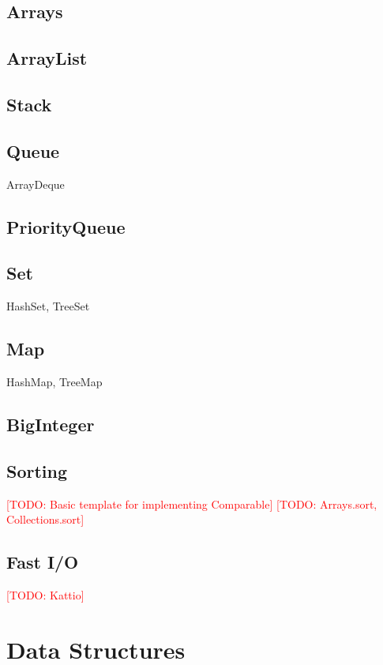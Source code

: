 \documentclass[10pt]{book}
\newcommand{\todo}[1]{\textcolor{red}{[TODO: #1]}}
\begin{document}
\section{Arrays}

\section{ArrayList}

\section{Stack}

\section{Queue}

ArrayDeque

\section{PriorityQueue}

\section{Set}

HashSet, TreeSet

\section{Map}

HashMap, TreeMap

\section{BigInteger}

\section{Sorting}

\todo{Basic template for implementing Comparable}
\todo{Arrays.sort, Collections.sort}

\section{Fast I/O} \label{sec:fastio}

\todo{Kattio}

\chapter{Data Structures}
\end{document}
